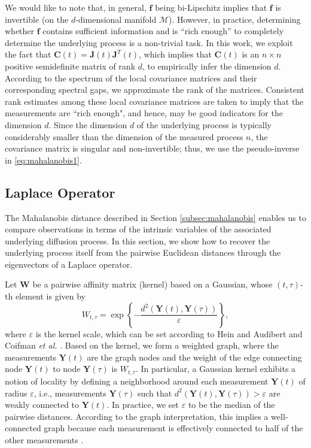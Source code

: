 %
We would like to note that, in general, $\mathbf{f}$ being bi-Lipschitz implies that $\mathbf{f}$ is invertible (on the $d$-dimensional
manifold $\mathcal{M}$).
%
However, in practice, determining whether $\mathbf{f}$ contains sufficient information and is ``rich enough'' to completely determine the underlying process is a non-trivial task.
%
In this work, we exploit the fact that $\mathbf{C}(t) = \mathbf{J}(t)\mathbf{J}^T(t)$, which implies that $\mathbf{C}(t)$ is an $n \times n$ positive semidefinite matrix of rank $d$, to empirically infer the dimension $d$.
%
According to the spectrum of the local covariance matrices and their corresponding spectral gaps, we approximate the rank of the matrices.
%
Consistent rank estimates among these local covariance matrices are taken to imply that the measurements are ``rich enough", and hence, may be good indicators for the dimension $d$.
%
Since the dimension $d$ of the underlying process is typically considerably smaller than the dimension of the measured process $n$,
the covariance matrix is singular and non-invertible;
%
thus, we use the pseudo-inverse in \eqref{eq:mahalanobis1}.

\subsection{Laplace Operator}
The Mahalanobis distance described in Section \ref{subsec:mahalanobis} enables us to compare observations in terms of the intrinsic variables of the associated underlying diffusion process.
%
In this section, we show how to recover the underlying process itself from the pairwise Euclidean distances through the eigenvectors of a Laplace operator.

Let $\mathbf{W}$ be a pairwise affinity matrix (kernel) based on a Gaussian, whose $(t,\tau)$-th element is given by
\begin{equation}
	W_{t,\tau} = \exp \left\{ - \frac{ d^2(\mathbf{Y}(t), \mathbf{Y}(\tau) )} {\varepsilon}\right\},
	\label{eq:kernel}
\end{equation}
where $\varepsilon$ is the kernel scale, which can be set according to Hein and Audibert \cite{hein2005intrinsic} and Coifman {\em et al.} \cite{coifman2008graph}.
%
Based on the kernel, we form a weighted graph, where the measurements $\mathbf{Y}(t)$ are the graph nodes and the weight of the edge connecting node $\mathbf{Y}(t)$ to node $\mathbf{Y}(\tau)$ is $W_{t,\tau}$.
%
In particular, a Gaussian kernel exhibits a notion of locality by defining a neighborhood around each measurement $\mathbf{Y}(t)$ of radius $\varepsilon$,
i.e., measurements $\mathbf{Y}(\tau)$ such that $d^2(\mathbf{Y}(t), \mathbf{Y}(\tau) ) > \varepsilon$ are weakly connected to $\mathbf{Y}(t)$.
%
In practice, we set $\varepsilon$ to be the median of the pairwise distances.
%
According to the graph interpretation, this implies a well-connected graph because each measurement is effectively connected to half of the other measurements \cite{rohrdanz2011determination}.

